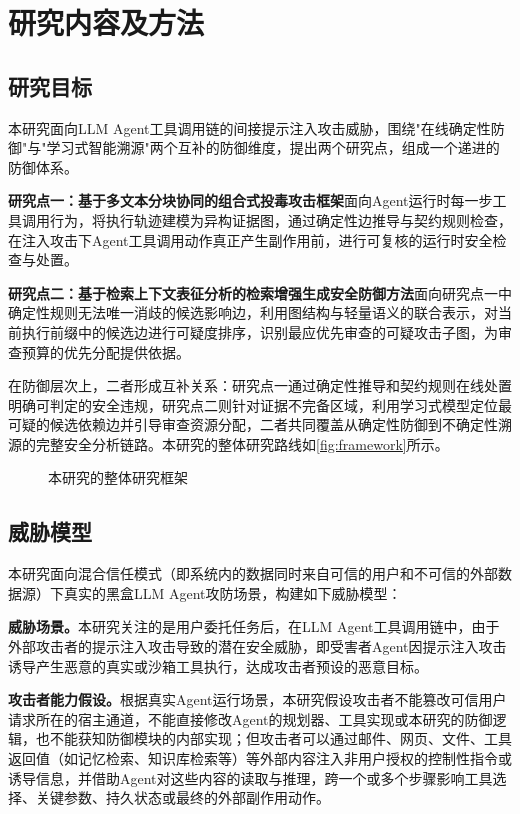 \section{研究内容及方法}

\subsection{研究目标}

本研究面向LLM Agent工具调用链的间接提示注入攻击威胁，围绕"在线确定性防御"与"学习式智能溯源"两个互补的防御维度，提出两个研究点，组成一个递进的防御体系。

\textbf{研究点一：基于多文本分块协同的组合式投毒攻击框架}面向Agent运行时每一步工具调用行为，将执行轨迹建模为异构证据图，通过确定性边推导与契约规则检查，在注入攻击下Agent工具调用动作真正产生副作用前，进行可复核的运行时安全检查与处置。

\textbf{研究点二：基于检索上下文表征分析的检索增强生成安全防御方法}面向研究点一中确定性规则无法唯一消歧的候选影响边，利用图结构与轻量语义的联合表示，对当前执行前缀中的候选边进行可疑度排序，识别最应优先审查的可疑攻击子图，为审查预算的优先分配提供依据。

在防御层次上，二者形成互补关系：研究点一通过确定性推导和契约规则在线处置明确可判定的安全违规，研究点二则针对证据不完备区域，利用学习式模型定位最可疑的候选依赖边并引导审查资源分配，二者共同覆盖从确定性防御到不确定性溯源的完整安全分析链路。本研究的整体研究路线如\autoref{fig:framework}所示。

\begin{figure}[htbp]
  \centering
  \resizebox{\textwidth}{!}{}
  \caption{本研究的整体研究框架}
  \label{fig:framework}
\end{figure}

\subsection{威胁模型}
本研究面向混合信任模式（即系统内的数据同时来自可信的用户和不可信的外部数据源）下真实的黑盒LLM Agent攻防场景，构建如下威胁模型：

\textbf{威胁场景。}本研究关注的是用户委托任务后，在LLM Agent工具调用链中，由于外部攻击者的提示注入攻击导致的潜在安全威胁，即受害者Agent因提示注入攻击诱导产生恶意的真实或沙箱工具执行，达成攻击者预设的恶意目标。

\textbf{攻击者能力假设。}根据真实Agent运行场景，本研究假设攻击者不能篡改可信用户请求所在的宿主通道，不能直接修改Agent的规划器、工具实现或本研究的防御逻辑，也不能获知防御模块的内部实现；但攻击者可以通过邮件、网页、文件、工具返回值（如记忆检索、知识库检索等）等外部内容注入非用户授权的控制性指令或诱导信息，并借助Agent对这些内容的读取与推理，跨一个或多个步骤影响工具选择、关键参数、持久状态或最终的外部副作用动作。

